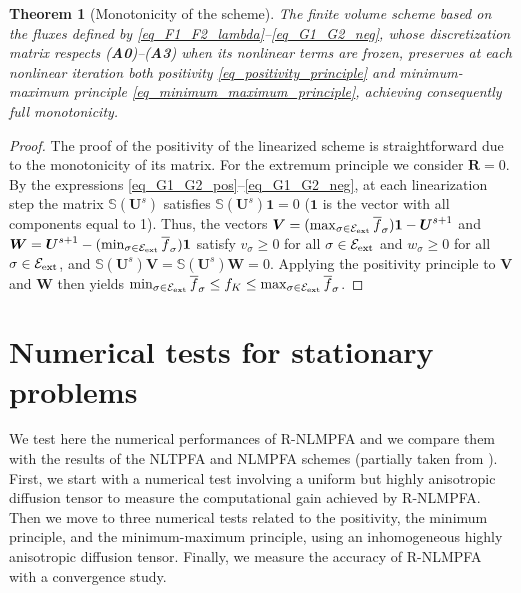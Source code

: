 \documentclass[final,11pt]{elsarticle}
\newtheorem{theorem}{Theorem}
\def\edges{{\mathcal E}}
\begin{document}
\begin{theorem}[Monotonicity of the scheme]
The finite volume scheme based on the fluxes defined by \eqref{eq_F1_F2_lambda}--\eqref{eq_G1_G2_neg}, whose discretization matrix respects (\textbf{A0})--(\textbf{A3}) when its nonlinear terms are frozen, preserves at each nonlinear iteration both positivity \eqref{eq_positivity_principle} and minimum-maximum principle \eqref{eq_minimum_maximum_principle}, achieving consequently full monotonicity.
\end{theorem}
\begin{proof}
The proof of the positivity of the linearized scheme is straightforward due to the monotonicity of its matrix. 
For the extremum principle we consider $\boldsymbol{R}=0$. By the expressions \eqref{eq_G1_G2_pos}--\eqref{eq_G1_G2_neg}, at each linearization step the matrix $\mathbb{S}(\boldsymbol{U}^s)$ satisfies $\mathbb{S}(\boldsymbol{U}^s)\boldsymbol{1}=0$ ($\boldsymbol{1}$ is the vector with all components equal to 1). Thus, the vectors $\boldsymbol{V}=(\max_{\sigma\in \edges_{\rm ext}}\overline{f}_\sigma)\boldsymbol{1}-\boldsymbol{U}^{s+1}$ and $\boldsymbol{W}=\boldsymbol{U}^{s+1}-(\min_{\sigma\in \edges_{\rm ext}}\overline{f}_\sigma)\boldsymbol{1}$ satisfy $v_\sigma\geq 0$ for all $\sigma\in \edges_{\rm ext}$ and $w_\sigma\geq 0$ for all $\sigma\in \edges_{\rm ext}$, and $\mathbb{S}(\boldsymbol{U}^s)\boldsymbol{V}=\mathbb{S}(\boldsymbol{U}^s)\boldsymbol{W}=0$.
Applying the positivity principle to $\boldsymbol{V}$ and $\boldsymbol{W}$ then yields $\min_{\sigma\in \edges_{\rm ext}}\overline{f}_\sigma\leq f_K\leq\max_{\sigma\in \edges_{\rm ext}}\overline{f}_\sigma$.
\end{proof}

\section{Numerical tests for stationary problems}\label{sec:tests}

We test here the numerical performances of R-NLMPFA and we compare them with the results of the NLTPFA and NLMPFA schemes (partially taken from \cite{dahmen2020a,dahmen2020b}). First, we start with a numerical test involving a uniform but highly anisotropic diffusion tensor to measure the computational gain achieved by R-NLMPFA. Then we move to three numerical tests related to the positivity, the minimum principle, and the minimum-maximum principle, using an inhomogeneous highly anisotropic diffusion tensor. Finally, we measure the accuracy of R-NLMPFA with a convergence study.
\end{document}

